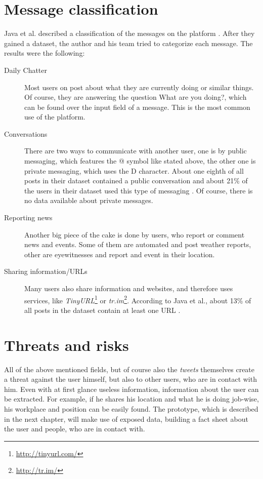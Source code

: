 \section{Message classification}

Java et al. described a classification of the messages on the \Twitter{}
platform \cite{java2007}. After they gained a dataset, the author and his team
tried to categorize each message. The results were the following:

\begin{description}

\item[Daily Chatter]
Most users on \Twitter{} post about what they are currently doing or similar
things. Of course, they are answering the question \flqq{}What are you
doing?\frqq{}, which can be found over the input field of a message. This is
the most common use of the \Twitter{} platform.

\item[Conversations]
There are two ways to communicate with another user, one is by public
messaging, which features the @ symbol like stated above, the other one is
private messaging, which uses the D character. About one eighth of all posts
in their dataset contained a public conversation and about 21\% of the users in
their dataset used this type of messaging \cite{java2007}. Of course, there is
no data available about private messages.

\item[Reporting news]
Another big piece of the cake is done by users, who report or comment news and
events. Some of them are automated and post weather reports, other are
eyewitnesses and report and event in their location.

\item[Sharing information/URLs]
Many users also share information and websites, and therefore uses services,
like \textit{TinyURL}\footnote{\url{http://tinyurl.com/}} or
\textit{tr.im}\footnote{\url{http://tr.im/}}. According to Java et al.,
about 13\% of all posts in the dataset contain at least one URL \cite{java2007}.

\end{description}


\section{Threats and risks}

All of the above mentioned fields, but of course also the \textit{tweets}
themselves create a threat against the user himself, but also to other users,
who are in contact with him. Even with at first glance useless information,
information about the user can be extracted. For example, if he shares his
location and what he is doing job-wise, his workplace and position can be
easily found. The prototype, which is described in the next chapter, will make
use of exposed data, building a fact sheet about the user and people, who are
in contact with.

